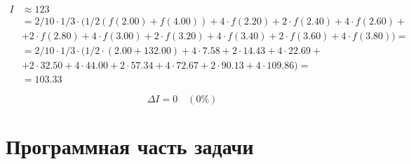 \begin{align*}
	I & \approx 123                                                                                                                                                                                                          \\
    & = 2/10 \cdot 1/3 \cdot \Big(1/2 (f(2.00) + f(4.00)) + 4 \cdot f(2.20) + 2 \cdot f(2.40) + 4 \cdot f(2.60) + \\ &+ 2 \cdot f(2.80) + 4 \cdot f(3.00) + 2 \cdot f(3.20) + 4 \cdot f(3.40) + 2 \cdot f(3.60) + 4 \cdot f(3.80)\Big) = \\
    & = 2/10 \cdot 1/3 \cdot \Big(1/2 \cdot (2.00 + 132.00) + 4 \cdot 7.58 + 2 \cdot 14.43 + 4 \cdot 22.69 + \\ &+ 2 \cdot 32.50 + 4 \cdot 44.00 + 2 \cdot 57.34 + 4 \cdot 72.67 + 2 \cdot 90.13 + 4 \cdot 109.86\Big) =                 \\
	  & = 103.33
\end{align*}

\[ \Delta I = 0 \quad (0\%) \]

\section{Программная часть задачи}
\inputminted[breaklines]{Python}{./solution.py}

